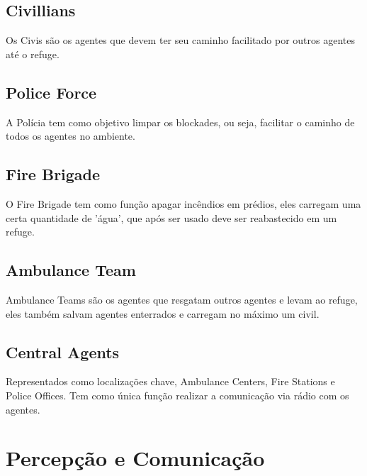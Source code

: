 \documentclass[conference]{IEEEtran}
\begin{document}
\subsection{Civillians}
Os Civis são os agentes que devem ter seu caminho facilitado por outros agentes até o refuge.
\subsection{Police Force}
A Polícia tem como objetivo limpar os blockades, ou seja, facilitar o caminho de todos os agentes no ambiente.
\subsection{Fire Brigade}
O Fire Brigade tem como função apagar incêndios em prédios, eles carregam uma certa quantidade de 'água', que após ser usado deve ser reabastecido em um refuge.
\subsection{Ambulance Team}
Ambulance Teams são os agentes que resgatam outros agentes e levam ao refuge, eles também salvam agentes enterrados e carregam no máximo um civil.
\subsection{Central Agents}
Representados como localizações chave, Ambulance Centers, Fire Stations e Police Offices. Tem como única função realizar a comunicação via rádio com os agentes.

\section{Percepção e Comunicação}
\end{document}
